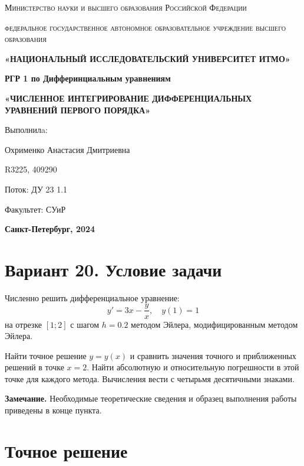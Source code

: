 \documentclass[a4paper,12pt]{article}
\begin{document}
\begin{titlepage}
    \centering
    {\scshape\large Министерство науки и высшего образования Российской Федерации\par}
    {\scshape\large федеральное государственное автономное образовательное учреждение высшего образования\par}
    {\bfseries\large «НАЦИОНАЛЬНЫЙ ИССЛЕДОВАТЕЛЬСКИЙ УНИВЕРСИТЕТ ИТМО»\par}
    \vspace{3cm}
    {\bfseries\Large РГР 1 по Дифферинциальным уравнениям\par}
    \vspace{1cm}
    {\bfseries\large «ЧИСЛЕННОЕ
ИНТЕГРИРОВАНИЕ
ДИФФЕРЕНЦИАЛЬНЫХ
УРАВНЕНИЙ ПЕРВОГО
ПОРЯДКА»\par}
    \vfill
    \hspace{0.5\linewidth}%
    \begin{minipage}{0.5\linewidth}
        Выполнилa: \par Охрименко Анастасия Дмитриевна \par
        R3225, 409290 \par
        Поток: ДУ 23 1.1 \par
        Факультет: СУиР \par
    \end{minipage}
    \vfill
    {\bfseries Санкт-Петербург, 2024\par}
\end{titlepage}






\section{Вариант 20. Условие задачи}

Численно решить дифференциальное уравнение:
\[
y' = 3x - \frac{y}{x}, \quad y(1) = 1
\]
на отрезке $[1; 2]$ с шагом $h = 0.2$ методом Эйлера, модифицированным методом Эйлера.

Найти точное решение $y = y(x)$ и сравнить значения точного и приближенных решений в точке $x = 2$. Найти абсолютную и относительную погрешности в этой точке для каждого метода. Вычисления вести с четырьмя десятичными знаками.

\textbf{Замечание.} Необходимые теоретические сведения и образец выполнения работы приведены в конце пункта.



\section{Точное решение}
\end{document}
